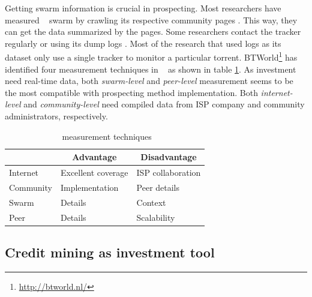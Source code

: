 Getting swarm information is crucial in prospecting. Most researchers have measured \bt~ swarm by crawling its respective community pages \cite{2013:survivepriv:jia, 2005:bittorrentcooperation:andrade, 2014:userbehaviourprivate:jia, 2010:pubpriv:meulpolder, 2014:sustainabilitytorrent:chen, 2012:economicbt:kash, 2013:investmentcm:capota, 2009:demandsupplyres:andrade, 2011:interswarm:capota}. This way, they can get the data summarized by the pages. Some researchers contact the tracker regularly or using its dump logs \cite{2011:yoshida:crawlbtnet, 2005:bittorrentcooperation:andrade,  2015:freeriderinbtcommunity:das, 2011:interswarm:capota}. Most of the research that used logs as its dataset only use a single tracker to monitor a particular torrent. BTWorld\footnote{\url{http://btworld.nl/}} has identified four measurement techniques in \bt~\cite{2010:btworld:wojciechowski} as shown in table \ref{tbl:btmeasuremethod}. As investment need real-time data, both \textit{swarm-level} and \textit{peer-level} measurement seems to be the most compatible with prospecting method implementation. Both \textit{internet-level} and \textit{community-level} need compiled data from ISP company and community administrators, respectively.


\begin{table}[ht]
	\centering
	\caption{\bt~measurement techniques \cite{2010:btworld:wojciechowski}}
	\label{tbl:btmeasuremethod}
	\begin{tabular}{|l|l|l|}
		\hline
		\rowcolor[HTML]{C0C0C0} 
		\multicolumn{1}{|c|}{\cellcolor[HTML]{C0C0C0}\textbf{Level}} & \multicolumn{1}{c|}{\cellcolor[HTML]{C0C0C0}\textbf{Advantage}} & \multicolumn{1}{c|}{\cellcolor[HTML]{C0C0C0}\textbf{Disadvantage}} \\ \hline
		Internet & Excellent coverage & ISP collaboration \\ \hline
		Community & Implementation & Peer details \\ \hline
		Swarm & Details & Context \\ \hline
		Peer & Details & Scalability \\ \hline
	\end{tabular}
\end{table}

\subsection{Credit mining as investment tool}

